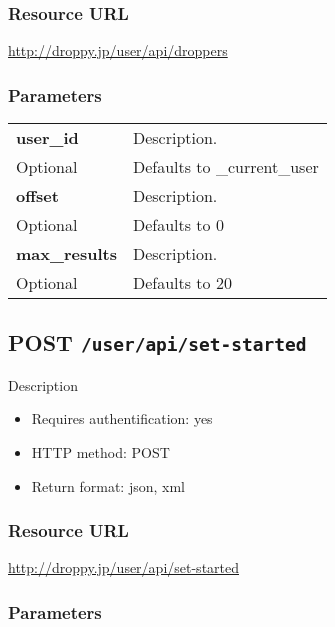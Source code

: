 \documentclass[11pt,a4paper]{article}
\newcommand{\content}[1]{\begin{minipage}{10cm}\vspace{2mm}#1\vspace{2mm}\end{minipage}}
\begin{document}
  \subsubsection*{Resource URL}
  \url{http://droppy.jp/user/api/droppers}
  \subsubsection*{Parameters}
  \begin{table}[h]
    \begin{center}
      \begin{tabular}{l l}
        \hline 
      \textbf{user\_id} & \content{Description. }
      \\
      Optional & Defaults to \_current\_user\\
      \hline
      \textbf{offset} & \content{Description. }
      \\
      Optional & Defaults to 0\\
      \hline
      \textbf{max\_results} & \content{Description. }
      \\
      Optional & Defaults to 20\\
      \hline
      \end{tabular}
    \end{center}
  \end{table}
  
      \newpage
      
      
  \subsection*{POST {\tt /user/api/set-started}}
  Description
  \begin{itemize}
  \item Requires authentification: yes
  \item HTTP method: POST
  \item Return format: json, xml
  \end{itemize}
  \subsubsection*{Resource URL}
  \url{http://droppy.jp/user/api/set-started}
  \subsubsection*{Parameters}
  \begin{table}[h]
    \begin{center}
      \begin{tabular}{l l}
        \hline 
      \end{tabular}
    \end{center}
  \end{table}
  
\end{document}
